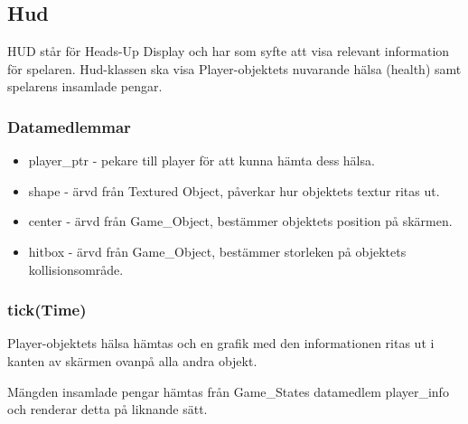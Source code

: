\documentclass{TDP005mall}
\begin{document}
\subsection{Hud}
HUD står för Heads-Up Display och har som syfte att visa relevant information för spelaren. 
Hud-klassen ska visa Player-objektets nuvarande hälsa (health) samt spelarens insamlade pengar.

\subsubsection{Datamedlemmar}
\begin{itemize}
\item player\_ptr - pekare till player för att kunna hämta dess hälsa.
\item shape - ärvd från Textured Object, påverkar hur objektets textur ritas ut.
\item center - ärvd från Game\_Object, bestämmer objektets position på skärmen.
\item hitbox - ärvd från Game\_Object, bestämmer storleken på objektets kollisionsområde.
\end{itemize}

\subsubsection{tick(Time)}
Player-objektets hälsa hämtas och en grafik med den informationen ritas ut i kanten av skärmen ovanpå alla andra objekt.

Mängden insamlade pengar hämtas från Game\_States datamedlem player\_info och renderar detta på liknande sätt. 
\end{document}
